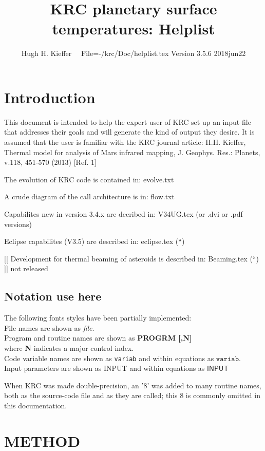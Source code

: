 \documentclass{article}
\title{KRC planetary surface temperatures: Helplist}
\author{Hugh H. Kieffer  \ \ File=-/krc/Doc/helplist.tex Version 3.5.6 2018jun22}
\newcommand{\qi}{\\ \hspace*{2.em}}      %
\newcommand{\qii}{\\ \hspace*{4.em}}     %
\newcommand{\np}{\textbf}  %
\newcommand{\nf}{\textit}  %
\newcommand{\nv}{\texttt}  %
\newcommand{\nvf}{\mathtt} %
\newcommand{\nj}{\textsf}  %
\newcommand{\njf}{\mathsf} %
\begin{document}
\maketitle

\tableofcontents


\section{Introduction} %

This document is intended to help the expert user of KRC set up an input file
that addresses their goals and will generate the kind of output they desire. It
is assumed that the user is familiar with the KRC journal article: H.H. Kieffer,
Thermal model for analysis of Mars infrared mapping, J. Geophys. Res.: Planets,
v.118, 451-570 (2013) [Ref. 1]

The evolution of KRC code is contained in:  evolve.txt 

A crude diagram of the call architecture is in:  flow.txt

Capabilites new in version 3.4.x are decribed in: V34UG.tex (or .dvi or .pdf versions)

Eclipse capabilites (V3.5) are described in: eclipse.tex  (``)

[[ Development for thermal beaming of asteroids is described in: Beaming.tex (``) ]] not released

\subsection{Notation use here}
The following fonts styles have been partially implemented: 
\qi File names are shown as \nf{file}. 
\qi Program and routine names are shown as \np{PROGRM [,N]} 
\qii where \np{N} indicates a major control index. 
\qi Code variable names are shown as \nv{variab} and within equations as $\nvf{variab}$.  
\qi Input parameters are shown as \nj{INPUT} and within equations as $\njf{INPUT}$

When KRC was made double-precision, an '8' was added to many routine names, both
as the source-code file and as they are called; this 8 is commonly omitted in
this documentation.

\section{METHOD}
\end{document}
